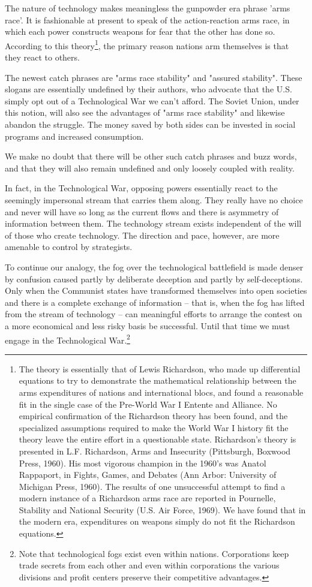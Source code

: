 The nature of technology makes meaningless the gunpowder era phrase 'arms race'. It is fashionable at present to speak of the action-reaction arms race, in which each power constructs weapons for fear that the other has done so. According to this theory\footnote{The theory is essentially that of Lewis Richardson, who made up differential equations to try to demonstrate the mathematical relationship between the arms expenditures of nations and international blocs, and found a reasonable fit in the single case of the Pre-World War I Entente and Alliance. No empirical confirmation of the Richardson theory has been found, and the specialized assumptions required to make the World War I history fit the theory leave the entire effort in a questionable state. Richardson's theory is presented in L.F. Richardson, Arms and Insecurity (Pittsburgh, Boxwood Press, 1960). His most vigorous champion in the 1960's was Anatol Rappaport, in Fights, Games, and Debates (Ann Arbor: University of Michigan Press, 1960). The results of one unsuccessful attempt to find a modern instance of a Richardson arms race are reported in Pournelle, Stability and National Security (U.S. Air Force, 1969). We have found that in the modern era, expenditures on weapons simply do not fit the Richardson equations.}, the primary reason nations arm themselves is that they react to others.

The newest catch phrases are "arms race stability" and "assured stability". These slogans are essentially undefined by their authors, who advocate that the U.S. simply opt out of a Technological War we can't afford. The Soviet Union, under this notion, will also see the advantages of "arms race stability" and likewise abandon the struggle. The money saved by both sides can be invested in social programs and increased consumption.

We make no doubt that there will be other such catch phrases and buzz words, and that they will also remain undefined and only loosely coupled with reality.

In fact, in the Technological War, opposing powers essentially react to the seemingly impersonal stream that carries them along. They really have no choice and never will have so long as the current flows and there is asymmetry of information between them. The technology stream exists independent of the will of those who create technology. The direction and pace, however, are more amenable to control by strategists.

To continue our analogy, the fog over the technological battlefield is made denser by confusion caused partly by deliberate deception and partly by self-deceptions. Only when the Communist states have transformed themselves into open societies and there is a complete exchange of information -- that is, when the fog has lifted from the stream of technology -- can meaningful efforts to arrange the contest on a more economical and less risky basis be successful. Until that time we must engage in the Technological War.\footnote{Note that technological fogs exist even within nations. Corporations keep trade secrets from each other and even within corporations the various divisions and profit centers preserve their competitive advantages.} 


